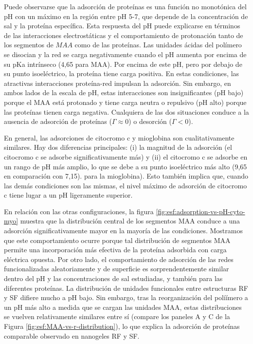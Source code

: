  
 Puede observarse que la adsorci\'on de prote\'inas es una funci\'on no monot\'onica del pH con un m\'aximo en la regi\'on entre pH 5-7, que depende de la concentraci\'on de sal y la prote\'ina espec\'ifica.
 Esta respuesta del pH puede explicarse en t\'erminos de las interacciones electrost\'aticas y el comportamiento de protonaci\'on tanto de los segmentos de $MAA$ como de las prote\'inas.
 Las unidades \'acidas del pol\'imero se disocian y la red se carga negativamente cuando el pH aumenta por encima de su pKa intr\'inseco (4,65 para MAA).
 Por encima de este pH, pero por debajo de su punto isoel\'ectrico, la prote\'ina tiene carga positiva.
 En estas condiciones, las atractivas interacciones prote\'ina-red impulsan la adsorci\'on.
 Sin embargo, en ambos lados de la escala de pH, estas interacciones son insignificantes (pH bajo) porque el MAA est\'a protonado y tiene carga neutra o repulsivo (pH alto) porque las prote\'inas tienen carga negativa.
 Cualquiera de las dos situaciones conduce a la ausencia de adsorci\'on de prote\'inas ($\Gamma\approx 0$) o desorci\'on ($\Gamma< 0$).
 
 
 
 En general, las adsorciones de citocromo c y mioglobina son cualitativamente similares.
 Hay dos diferencias principales: (i) la magnitud de la adsorci\'on (el citocromo c se adsorbe significativamente m\'as) y (ii) el citocromo c se adsorbe en un rango de pH m\'as amplio, lo que se debe a su punto isoel\'ectrico m\'as alto (9,65 en comparaci\'on con 7,15). para la mioglobina).
 Esto tambi\'en implica que, cuando las dem\'as condiciones son las mismas, el nivel m\'aximo de adsorci\'on de citocromo c tiene lugar a un pH ligeramente superior.
 
 En relaci\'on con las otras configuraciones, la figura \ref{fig:esf:adsorption-vs-pH-cyto-myo} muestra que la distribuci\'on central de los segmentos MAA conduce a una adsorci\'on significativamente mayor en la mayor\'ia de las condiciones.
 Mostramos que este comportamiento ocurre porque tal distribuci\'on de segmentos MAA permite una incorporaci\'on m\'as efectiva de la prote\'ina adsorbida con carga el\'ectrica opuesta.
 Por otro lado, el comportamiento de adsorci\'on de las redes funcionalizadas aleatoriamente y de superficie es sorprendentemente similar dentro del pH y las concentraciones de sal estudiadas, y tambi\'en para las diferentes prote\'inas.
 La distribuci\'on de unidades funcionales entre estructuras RF y SF difiere mucho a pH bajo.
 Sin embargo, tras la reorganizaci\'on del polí\'imero a un pH m\'as alto a medida que se cargan las unidades MAA, estas distribuciones se vuelven relativamente similares entre s\'i (compare los paneles A y C de la Figura \ref{fig:esf:MAA-vs-r-distribution}), lo que explica la adsorci\'on de prote\'inas comparable observado en nanogeles RF y SF.




